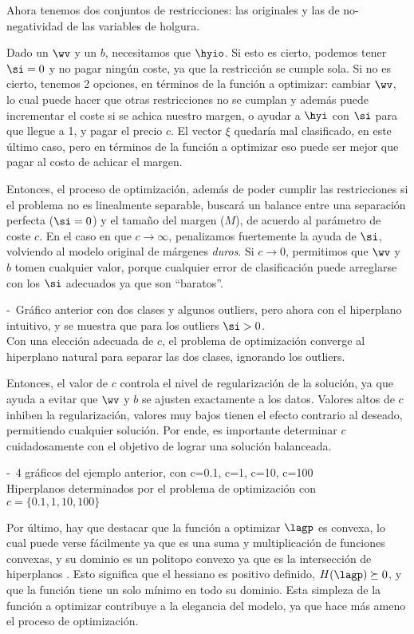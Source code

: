 Ahora tenemos dos conjuntos de restricciones: las originales y las de no-negatividad de las variables de holgura.

Dado un $\wv$ y un $b$, necesitamos que $\hyio$. Si esto es cierto, podemos tener $\si=0$ y no pagar ningún coste, ya que la restricción se cumple sola. Si no es cierto, tenemos 2 opciones, en términos de la función a optimizar:  cambiar $\wv$, lo cual puede hacer que otras restricciones no se cumplan y además puede incrementar el coste si se achica nuestro margen, o ayudar a $\hyi$ con $\si$ para que llegue a 1, y pagar el precio $c$. El vector $\xi$ quedaría mal clasificado, en este último caso, pero en términos de la función a optimizar eso puede ser mejor que pagar al costo de achicar el margen. 

Entonces, el proceso de optimización, además de poder cumplir las restricciones si el problema no es linealmente separable, buscará un balance entre una separación perfecta ($\si=0$) y el tamaño del margen ($M$), de acuerdo al parámetro de coste $c$. En el caso en que $c \rightarrow \infty$, penalizamos fuertemente la ayuda de $\si$, volviendo al modelo original de márgenes \textit{duros}. Si $c \rightarrow 0$, permitimos que $\wv$ y $b$ tomen cualquier valor, porque cualquier error de clasificación puede arreglarse con los $\si$ adecuados ya que son ``baratos''.

-\
Gráfico anterior con dos clases y algunos outliers, pero ahora con el hiperplano intuitivo, y se muestra que para los outliers $\si>0$.\\
Con una elección adecuada de $c$, el problema de optimización converge al hiperplano natural para separar las dos clases, ignorando los outliers.


Entonces, el valor de $c$ controla el nivel de regularización de la solución, ya que ayuda a evitar que $\wv$ y $b$ se ajusten exactamente a los datos. Valores altos de $c$ inhiben la regularización, valores muy bajos tienen el efecto contrario al deseado, permitiendo cualquier solución. Por ende, es importante determinar $c$ cuidadosamente con el objetivo de lograr una solución balanceada.

-\ 
4 gráficos del ejemplo anterior, con c=0.1, c=1, c=10, c=100\\
Hiperplanos determinados por el problema de optimización con $c=\{ 0.1,1,10,100\}$

Por último, hay que destacar que la función a optimizar $\lagp$ es convexa, lo cual puede verse fácilmente ya que es una suma y multiplicación de funciones convexas, y su dominio es un politopo convexo ya que es la intersección de hiperplanos \cite{boyd2004}. Esto significa que el hessiano es positivo definido, $H(\lagp) \succeq 0$, y que la función tiene un solo mínimo en todo su dominio. Esta simpleza de la función a optimizar contribuye a la elegancia del modelo, ya que hace más ameno el proceso de optimización.